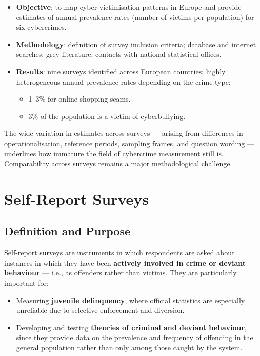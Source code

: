 \documentclass[11pt,a4paper,openany]{report}
\theoremstyle{definition}
\theoremstyle{plain}
\theoremstyle{remark}
\begin{document}
\begin{itemize}
    \item \textbf{Objective}: to map cyber-victimisation patterns in Europe and provide estimates of annual prevalence rates (number of victims per population) for six cybercrimes.
    \item \textbf{Methodology}: definition of survey inclusion criteria; database and internet searches; grey literature; contacts with national statistical offices.
    \item \textbf{Results}: nine surveys identified across European countries; highly heterogeneous annual prevalence rates depending on the crime type:
    \begin{itemize}
        \item 1--3\% for online shopping scams.
        \item 3\% of the population is a victim of cyberbullying.
    \end{itemize}
\end{itemize}

The wide variation in estimates across surveys --- arising from differences in operationalisation, reference periods, sampling frames, and question wording --- underlines how immature the field of cybercrime measurement still is. Comparability across surveys remains a major methodological challenge.

\section{Self-Report Surveys}

\subsection{Definition and Purpose}

Self-report surveys are instruments in which respondents are asked about instances in which they have been \textbf{actively involved in crime or deviant behaviour} --- i.e., as offenders rather than victims. They are particularly important for:

\begin{itemize}
    \item Measuring \textbf{juvenile delinquency}, where official statistics are especially unreliable due to selective enforcement and diversion.
    \item Developing and testing \textbf{theories of criminal and deviant behaviour}, since they provide data on the prevalence and frequency of offending in the general population rather than only among those caught by the system.
\end{itemize}
\end{document}
